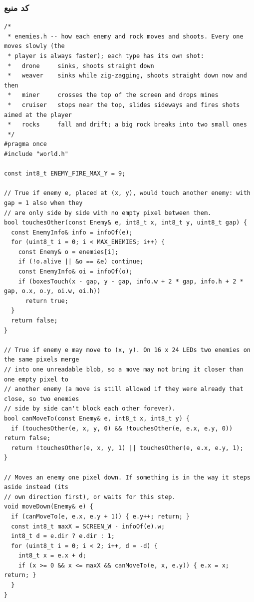 \documentclass[11pt,a4paper]{article}
\begin{document}
\subsubsection*{کد منبع}
\begin{latin}
\begin{lstlisting}[language=Arduino]
/*
 * enemies.h -- how each enemy and rock moves and shoots. Every one moves slowly (the
 * player is always faster); each type has its own shot:
 *   drone     sinks, shoots straight down
 *   weaver    sinks while zig-zagging, shoots straight down now and then
 *   miner     crosses the top of the screen and drops mines
 *   cruiser   stops near the top, slides sideways and fires shots aimed at the player
 *   rocks     fall and drift; a big rock breaks into two small ones
 */
#pragma once
#include "world.h"

const int8_t ENEMY_FIRE_MAX_Y = 9;

// True if enemy e, placed at (x, y), would touch another enemy: with gap = 1 also when they
// are only side by side with no empty pixel between them.
bool touchesOther(const Enemy& e, int8_t x, int8_t y, uint8_t gap) {
  const EnemyInfo& info = infoOf(e);
  for (uint8_t i = 0; i < MAX_ENEMIES; i++) {
    const Enemy& o = enemies[i];
    if (!o.alive || &o == &e) continue;
    const EnemyInfo& oi = infoOf(o);
    if (boxesTouch(x - gap, y - gap, info.w + 2 * gap, info.h + 2 * gap, o.x, o.y, oi.w, oi.h))
      return true;
  }
  return false;
}

// True if enemy e may move to (x, y). On 16 x 24 LEDs two enemies on the same pixels merge
// into one unreadable blob, so a move may not bring it closer than one empty pixel to
// another enemy (a move is still allowed if they were already that close, so two enemies
// side by side can't block each other forever).
bool canMoveTo(const Enemy& e, int8_t x, int8_t y) {
  if (touchesOther(e, x, y, 0) && !touchesOther(e, e.x, e.y, 0)) return false;
  return !touchesOther(e, x, y, 1) || touchesOther(e, e.x, e.y, 1);
}

// Moves an enemy one pixel down. If something is in the way it steps aside instead (its
// own direction first), or waits for this step.
void moveDown(Enemy& e) {
  if (canMoveTo(e, e.x, e.y + 1)) { e.y++; return; }
  const int8_t maxX = SCREEN_W - infoOf(e).w;
  int8_t d = e.dir ? e.dir : 1;
  for (uint8_t i = 0; i < 2; i++, d = -d) {
    int8_t x = e.x + d;
    if (x >= 0 && x <= maxX && canMoveTo(e, x, e.y)) { e.x = x; return; }
  }
}


\end{lstlisting}
\end{latin}
\end{document}
